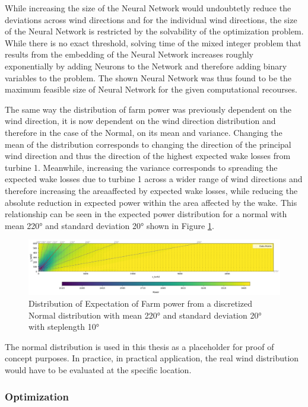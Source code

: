 While increasing the size of the Neural Network would undoubtetly reduce the deviations across wind directions and for the individual wind directions, the size of the Neural Network is restricted by the solvability of the optimization problem. While there is no exact threshold, solving time of the mixed integer problem that results from the embedding of the Neural Network increases roughly exponentially by adding Neurons to the Network and therefore adding binary variables to the problem. The shown Neural Network was thus found to be the maximum feasible size of Neural Network for the given computational recourses. 

The same way the distribution of farm power was previously dependent on the wind direction, it is now dependent on the wind direction distribution and therefore in the case of the Normal, on its mean and variance. Changing the mean of the distribution corresponds to changing the direction of the principal wind direction and thus the direction of the highest expected wake losses from turbine 1. Meanwhile, increasing the variance corresponds to spreading the expected wake losses due to turbine 1 across a wider range of wind directions and therefore increasing the areaaffected by expected wake losses, while reducing the absolute reduction in expected power within the area affected by the wake. This relationship can be seen in the expected power distribution for a normal with mean 220° and standard deviation 20° shown in Figure \ref{fig:wind_dist_opti2}.


\begin{figure}[h] 
	\centering
	\includegraphics[width=1\textwidth]{figures/optimization/prob_expectation2.png} 
	\caption{Distribution of Expectation of Farm power from a discretized Normal distribution with mean 220° and standard deviation 20° with steplength 10°}
	\label{fig:wind_dist_opti2}
\end{figure}


The normal distribution is used in this thesis as a placeholder for proof of concept purposes. In practice, in practical application, the real wind distribution would have to be evaluated at the specific location. 

\subsubsection{Optimization}

